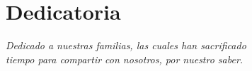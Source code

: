 \chapter*{\flushright Dedicatoria}

\begin{flushright}
	\textit{Dedicado a nuestras familias, las cuales han sacrificado \\ tiempo para compartir con nosotros, por nuestro saber.}
\end{flushright}
